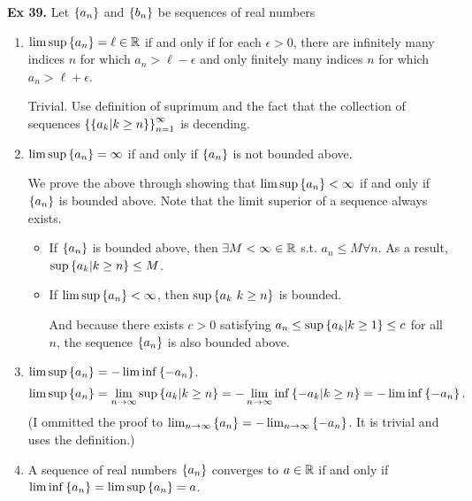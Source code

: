 \noindent \textbf{Ex 39.} \label{ex:39}
Let $\left\{a_n\right\}$ and $\left\{b_n\right\}$ be sequences of real numbers
\begin{enumerate}[label=(\roman*)]
    \item $\limsup\left\{a_n\right\} = \ell \in \mathbb{R}$ if and only if for each $\epsilon > 0$, there are infinitely many indices $n$ for which $a_n > \ell - \epsilon$ and only finitely many indices $n$ for which $a_n > \ell + \epsilon$.
    
    Trivial. Use definition of suprimum and the fact that the collection of sequences $\left\{\left\{a_k | k \geq n\right\}\right\}_{n=1}^\infty$ is decending.

    \item $\limsup\left\{a_n\right\} = \infty$ if and only if $\left\{a_n\right\}$ is not bounded above.
    
    We prove the above through showing that $\limsup\left\{a_n\right\} < \infty$ if and only if $\left\{a_n\right\}$ is bounded above. Note that the limit superior of a sequence always exists.
    \begin{itemize}
        \item If $\left\{a_n\right\}$ is bounded above, then $\exists M < \infty \in \mathbb{R}$ s.t. $a_n \leq M \forall n$.
        As a result, $\sup\left\{a_k | k \geq n\right\} \leq M$.
        \item If $\limsup\left\{a_n\right\} < \infty$, then $\sup\left\{a_k \ k \geq n\right\}$ is bounded.
        
        And because there exists $c > 0$ satisfying $a_n \leq \sup\left\{a_k | k \geq 1\right\} \leq c$ for all $n$, the sequence $\left\{a_n\right\}$ is also bounded above.
    \end{itemize}

    \item $\limsup\left\{a_n\right\} = -\liminf\left\{-a_n\right\}$.
    \[\limsup\left\{a_n\right\} = \lim_{n\to\infty}\sup\left\{a_k | k \geq n\right\} = -\lim_{n\to\infty}\inf\left\{-a_k | k \geq n\right\} = -\liminf\left\{-a_n\right\}.\]
    (I ommitted the proof to $\lim_{n\to\infty}\left\{a_n\right\} = -\lim_{n\to\infty}\left\{-a_n\right\}$. It is trivial and uses the definition.)

    \item A sequence of real numbers $\left\{a_n\right\}$ converges to $a \in \mathbb{R}$ if and only if $\liminf\left\{a_n\right\} = \limsup\left\{a_n\right\} = a$.
    

\end{enumerate}
